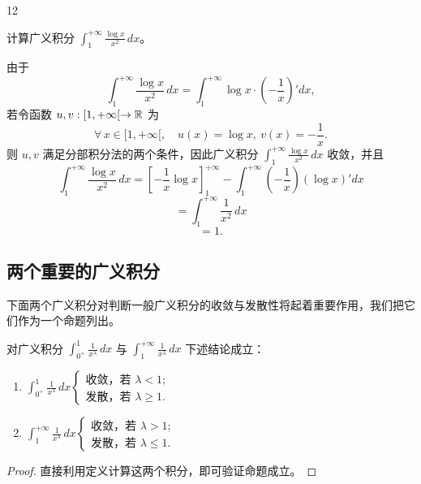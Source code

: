\begin{sourceexample}{12}

计算广义积分 $\displaystyle\int_1^{+\infty}\frac{\log x}{x^2}\,dx$。

\end{sourceexample}

由于
\[\int_1^{+\infty}\frac{\log x}{x^2}\,dx=\int_1^{+\infty}\log x\cdot\left(-\frac{1}{x}\right)'dx,\]
若令函数 $u,v:[1,+\infty[\to\mathbb{R}$ 为
\[\forall\,x\in[1,+\infty[,\quad u(x)=\log x,\ v(x)=-\frac{1}{x}.\]
则 $u,v$ 满足分部积分法的两个条件，因此广义积分 $\displaystyle\int_1^{+\infty}\frac{\log x}{x^2}\,dx$ 收敛，并且
\[\int_1^{+\infty}\frac{\log x}{x^2}\,dx=\left[-\frac{1}{x}\log x\right]_1^{+\infty}-\int_1^{+\infty}\left(-\frac{1}{x}\right)(\log x)'dx\]
\[=\int_1^{+\infty}\frac{1}{x^2}\,dx\]
\[=1.\]

\subsection{两个重要的广义积分}

下面两个广义积分对判断一般广义积分的收敛与发散性将起着重要作用，我们把它们作为一个命题列出。

\begin{myprop*}{}

对广义积分 $\displaystyle\int_{0^+}^1\frac{1}{x^{\lambda}}\,dx$ 与 $\displaystyle\int_1^{+\infty}\frac{1}{x^{\lambda}}\,dx$ 下述结论成立：

\begin{enumerate}[label=\arabic{enumi})]
\item $\displaystyle\int_{0^+}^1\frac{1}{x^{\lambda}}\,dx\begin{cases} \text{收敛，若 }\lambda<1;\\ \text{发散，若 }\lambda\geqslant1. \end{cases}$
\item $\displaystyle\int_1^{+\infty}\frac{1}{x^{\lambda}}\,dx\begin{cases} \text{收敛，若 }\lambda>1;\\ \text{发散，若 }\lambda\leqslant1. \end{cases}$
\end{enumerate}

\end{myprop*}

\begin{proof}

直接利用定义计算这两个积分，即可验证命题成立。

\end{proof}

